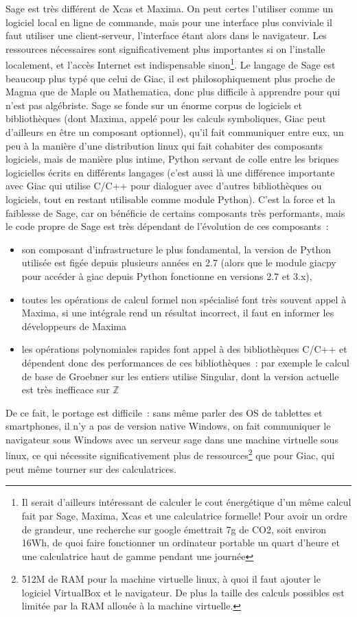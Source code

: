 \documentclass[a4paper,11pt]{article}
\newcommand{\Z}{{\mathbb{Z}}}
\begin{document}
\begin{giacjshere}
Sage est tr\`es diff\'erent de Xcas et Maxima. On peut certes l'utiliser
comme un logiciel local en ligne de commande, mais
pour une interface plus conviviale il faut utiliser une 
client-serveur, l'interface \'etant alors dans le navigateur. Les
ressources n\'ecessaires sont significativement plus importantes
si on l'installe localement, et l'acc\`es Internet est indispensable
sinon\footnote{Il serait d'ailleurs int\'eressant de calculer le 
cout \'energ\'etique d'un m\^eme calcul fait par Sage, Maxima, 
Xcas et une calculatrice formelle! Pour avoir un ordre
de grandeur, une recherche sur google \'emettrait 7g de CO2, 
soit environ 16Wh, de quoi faire fonctionner un ordinateur 
portable un quart d'heure et une calculatrice haut de gamme
pendant une journ\'ee}. Le langage de 
Sage est beaucoup plus typ\'e que celui de Giac, il est
philosophiquement
plus proche de Magma que de Maple ou Mathematica,
donc plus difficile \`a apprendre pour qui n'est pas alg\'ebriste.
Sage se fonde sur un \'enorme corpus de logiciels et
biblioth\`eques (dont Maxima, appel\'e pour les calculs symboliques,
Giac peut d'ailleurs en \^etre un composant
optionnel), qu'il fait communiquer entre eux, un peu \`a la
mani\`ere d'une distribution linux qui fait cohabiter des composants
logiciels, mais de mani\`ere plus intime, Python servant
de colle entre les briques logicielles \'ecrits en diff\'erents
langages (c'est aussi l\`a une diff\'erence importante avec Giac
qui utilise C/C++ pour dialoguer avec d'autres biblioth\`eques
ou logiciels, tout en restant utilisable comme module
Python). C'est la force et la
faiblesse de Sage, car on b\'en\'eficie de certains composants tr\`es
performants, mais le code propre de Sage est tr\`es d\'ependant
de l'\'evolution de ces composants~:
\begin{itemize}
\item son composant d'infrastructure le plus fondamental, 
la version de Python utilis\'ee est
fig\'ee depuis plusieurs ann\'ees en 2.7 (alors que le module
giacpy pour acc\'eder \`a giac depuis Python fonctionne
en versions 2.7 et 3.x),
\item toutes les op\'erations de calcul formel non
sp\'ecialis\'e font tr\`es souvent appel \`a Maxima,
si une int\'egrale rend un r\'esultat incorrect, il faut en informer
les d\'eveloppeurs de Maxima
\item
les op\'erations polynomiales rapides font appel \`a des
biblioth\`eques C/C++ et d\'ependent donc des performances
de ces biblioth\`eques~: par exemple le calcul de base
de Groebner sur les entiers utilise Singular, dont la version
actuelle est tr\`es inefficace sur $\Z$
\end{itemize} 
De ce fait, le portage est difficile~: sans m\^eme parler des OS de tablettes
et smartphones, il n'y a pas de version native Windows,
on fait communiquer le navigateur sous Windows avec un serveur
sage dans une machine virtuelle sous linux, ce qui n\'ecessite
significativement plus de ressources\footnote{512M de RAM pour la
machine virtuelle linux, \`a quoi il faut ajouter 
le logiciel VirtualBox et le navigateur. De plus la taille des
calculs possibles est limit\'ee par la RAM allou\'ee \`a
la machine virtuelle.} que pour Giac, 
qui peut m\^eme tourner sur des calculatrices.


\end{giacjshere}
\end{document}

